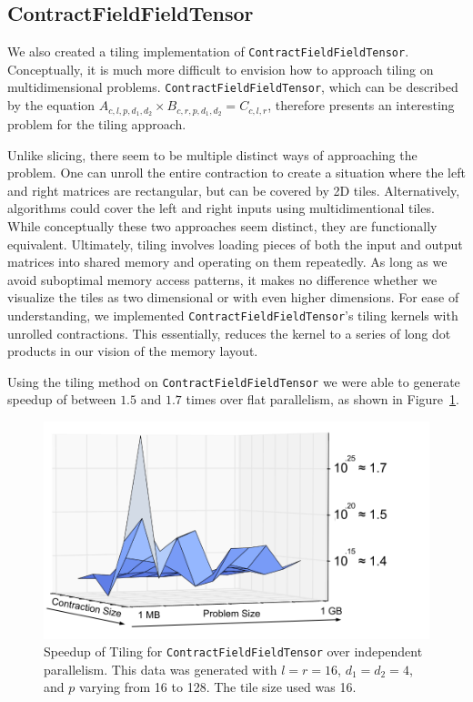 \subsection{ContractFieldFieldTensor}

We also created a tiling implementation of \texttt{ContractFieldFieldTensor}. Conceptually, it is much more difficult to envision how to approach tiling on multidimensional problems. \texttt{ContractFieldFieldTensor}, which can be described by the equation $A_{c,l,p,d_1,d_2} \times B_{c, r, p,d_1,d_2} = C_{c,l, r}$, therefore presents an interesting problem for the tiling approach. 

Unlike slicing, there seem to be multiple distinct ways of approaching the
problem. One can unroll the entire contraction to create a situation where
the left and right matrices are rectangular, but can be covered by 2D tiles.
Alternatively, algorithms could cover the left and right inputs using
multidimentional tiles. While conceptually these two approaches seem distinct,
they are functionally equivalent. Ultimately, tiling involves loading pieces of
both the input and output matrices into shared memory and operating on them
repeatedly. As long as we avoid suboptimal memory access patterns, it makes no
difference whether we visualize the tiles as two dimensional or with even higher
dimensions. For ease of understanding, we implemented
\texttt{ContractFieldFieldTensor}'s tiling kernels with unrolled
contractions. This essentially, reduces the kernel to a series of long dot
products in our vision of the memory layout. 

Using the tiling method on \texttt{ContractFieldFieldTensor} we were able to generate speedup of between $1.5$ and $1.7$ times over flat parallelism, as shown in Figure~\ref{fig:CFFTSpeedup}. 

\begin{figure}[H]
    \centering
\includegraphics[scale = .4]{ContractFieldFieldTensor}
\caption[\texttt{ContractFieldFieldScalar} Tiling performance]{Speedup of Tiling
    for \texttt{ContractFieldFieldTensor} over independent parallelism. This data was
    generated with $l = r = 16$, $d_1 =
d_2 = 4$, and $p$ varying from 16 to 128. The tile size used was 16.}
\label{fig:CFFTSpeedup}
\end{figure}

